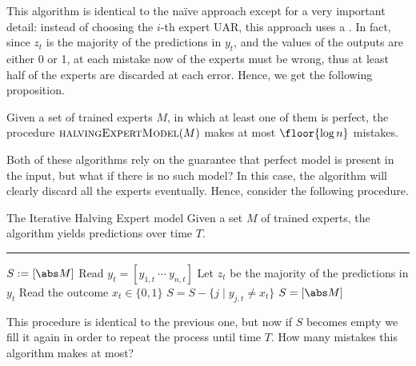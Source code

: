 \documentclass[a4paper, 12pt]{report}
\begin{document}
    This algorithm is identical to the naïve approach except for a very important detail: instead of choosing the $i$-th expert UAR, this approach uses a . In fact, since $z_t$ is the majority of the predictions in $y_t$, and the values of the outputs are either 0 or 1, at each mistake now  of the experts must be wrong, thus at least half of the experts are discarded at each error. Hence, we get the following proposition.

    \begin{framedprop}{}
        Given a set of trained experts $M$, in which at least one of them is perfect, the procedure $\textsc{halvingExpertModel}(M)$ makes at most $\floor{\log n}$ mistakes.
    \end{framedprop}

    Both of these algorithms rely on the guarantee that  perfect model is present in the input, but what if there is no such model? In this case, the algorithm will clearly discard all the experts eventually. Hence, consider the following procedure.

    \begin{framedalgo}{The Iterative Halving Expert model}
        Given a set $M$ of trained experts, the algorithm yields predictions over time $T$. \\
        \hrule

        \quad
        \begin{algorithmic}[1]
                \State $S := [\abs M]$
                    \State Read $y_t = [y_{1, t} \ \cdots \ y_{n, t}]$
                    \State Let $z_t$ be the majority of the predictions in $y_t$
                    \State Read the outcome $x_t \in \{0, 1\}$
                        \State $S = S - \{j \mid y_{j, t} \neq x_t\}$
                         
                            \State $S = [\abs M]$
                        \EndIf
                    \EndIf
                \EndFor
            \EndFunction
        \end{algorithmic}
    \end{framedalgo}

    This procedure is identical to the previous one, but now if $S$ becomes empty we fill it again in order to repeat the process until time $T$. How many mistakes this algorithm makes at most?
\end{document}
